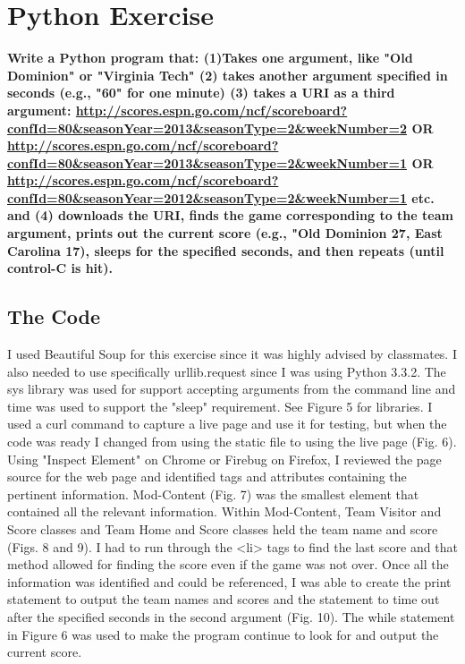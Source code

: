 \documentclass{article}
\begin{document}
\section{Python Exercise}
\textbf{Write a Python program that:
(1)Takes one argument, like "Old Dominion" or "Virginia Tech" (2) takes another argument specified in seconds (e.g., "60" for one minute) (3) takes a URI as a third argument: \url{http://scores.espn.go.com/ncf/scoreboard?confId=80&seasonYear=2013&seasonType=2&weekNumber=2} \textbf{OR} \url{http://scores.espn.go.com/ncf/scoreboard?confId=80&seasonYear=2013&seasonType=2&weekNumber=1} \textbf{OR} \url{http://scores.espn.go.com/ncf/scoreboard?confId=80&seasonYear=2012&seasonType=2&weekNumber=1} etc. and (4) downloads the URI, finds the game corresponding to the team argument, prints out the current score (e.g., "Old Dominion 27, East Carolina 17), sleeps for the specified seconds, and then repeats (until control-C is hit).} 


\subsection*{The Code}

I used Beautiful Soup for this exercise since it was highly advised by classmates. I also needed to use specifically urllib.request since I was using Python 3.3.2. The sys library was used for support accepting arguments from the command line and time was used to support the "sleep" requirement. See Figure 5 for libraries. I used a curl command to capture a live page and use it for testing, but when the code was ready I changed from using the static file to using the live page (Fig. 6). Using "Inspect Element" on Chrome or Firebug on Firefox, I reviewed the page source for the web page and identified tags and attributes containing the pertinent information. Mod-Content (Fig. 7) was the smallest element that contained all the relevant information. Within Mod-Content, Team Visitor and Score classes and Team Home and Score classes held the team name and score (Figs. 8 and 9). I had to run through the <li> tags to find the last score and that method allowed for finding the score even if the game was not over. Once all the information was identified and could be referenced, I was able to create the print statement to output the team names and scores and the statement to time out after the specified seconds in the second argument (Fig. 10). The while statement in Figure 6 was used to make the program continue to look for and output the current score.
\end{document}
